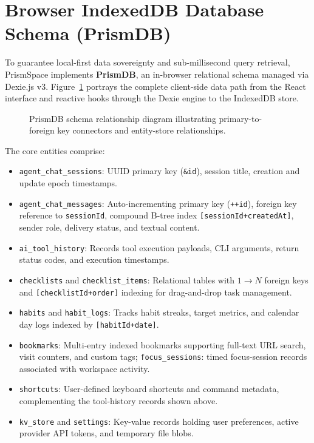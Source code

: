 \documentclass[12pt,a4paper]{report}
\begin{document}
\section{Browser IndexedDB Database Schema (PrismDB)}
To guarantee local-first data sovereignty and sub-millisecond query retrieval, PrismSpace implements \textbf{PrismDB}, an in-browser relational schema managed via Dexie.js v3. Figure~\ref{fig:db_schema} portrays the complete client-side data path from the React interface and reactive hooks through the Dexie engine to the IndexedDB store.

\begin{figure}[H]
    \centering
    \caption{PrismDB schema relationship diagram illustrating primary-to-foreign key connectors and entity-store relationships.}
    \label{fig:db_schema}
\end{figure}

The core entities comprise:
\begin{itemize}
    \item \texttt{agent\_chat\_sessions}: UUID primary key (\texttt{\&id}), session title, creation and update epoch timestamps.
    \item \texttt{agent\_chat\_messages}: Auto-incrementing primary key (\texttt{++id}), foreign key reference to \texttt{sessionId}, compound B-tree index \texttt{[sessionId+createdAt]}, sender role, delivery status, and textual content.
    \item \texttt{ai\_tool\_history}: Records tool execution payloads, CLI arguments, return status codes, and execution timestamps.
    \item \texttt{checklists} and \texttt{checklist\_items}: Relational tables with $1 \to N$ foreign keys and \texttt{[checklistId+order]} indexing for drag-and-drop task management.
    \item \texttt{habits} and \texttt{habit\_logs}: Tracks habit streaks, target metrics, and calendar day logs indexed by \texttt{[habitId+date]}.
    \item \texttt{bookmarks}: Multi-entry indexed bookmarks supporting full-text URL search, visit counters, and custom tags; \texttt{focus\_sessions}: timed focus-session records associated with workspace activity.
    \item \texttt{shortcuts}: User-defined keyboard shortcuts and command metadata, complementing the tool-history records shown above.
    \item \texttt{kv\_store} and \texttt{settings}: Key-value records holding user preferences, active provider API tokens, and temporary file blobs.
\end{itemize}
\end{document}
